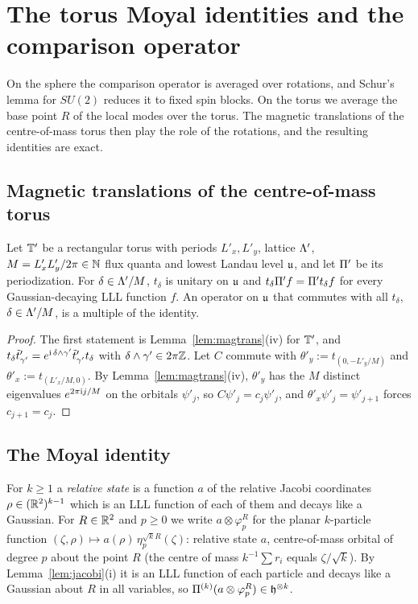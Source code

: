\section{The torus Moyal identities and the comparison operator}\label{sec:moyal}

On the sphere the comparison operator is averaged over rotations, and Schur's lemma for $SU(2)$ reduces it to fixed
spin blocks. On the torus we average the base point $R$ of the local modes over the torus. The magnetic translations
of the centre-of-mass torus then play the role of the rotations, and the resulting identities are exact.

\subsection{Magnetic translations of the centre-of-mass torus}

\begin{lemma}\label{lem:irred}
Let $\mathbb{T}'$ be a rectangular torus with periods $L'_x,L'_y$, lattice $\Lambda'$, $M=L'_xL'_y/2\pi\in\mathbb{N}$ flux quanta and lowest
Landau level $\mathfrak{u}$, and let $\Pi'$ be its periodization. For $\delta\in\Lambda'/M$, $t_\delta$ is unitary on $\mathfrak{u}$ and
$t_\delta\Pi'f=\Pi't_\delta f$ for every Gaussian-decaying LLL function $f$. An operator on $\mathfrak{u}$ that commutes with all $t_\delta$,
$\delta\in\Lambda'/M$, is a multiple of the identity.
\end{lemma}

\begin{proof}
The first statement is Lemma~\ref{lem:magtrans}(iv) for $\mathbb{T}'$, and $t_\delta\tilde t'_{\gamma'}=e^{\mathrm{i}\,\delta\wedge\gamma'}\tilde t'_{\gamma'}t_\delta$
with $\delta\wedge\gamma'\in2\pi\mathbb{Z}$. Let $C$ commute with $\theta'_y:=t_{(0,-L'_y/M)}$ and $\theta'_x:=t_{(L'_x/M,0)}$. By
Lemma~\ref{lem:magtrans}(iv), $\theta'_y$ has the $M$ distinct eigenvalues $e^{2\pi\mathrm{i} j/M}$ on the orbitals $\psi'_j$, so
$C\psi'_j=c_j\psi'_j$, and $\theta'_x\psi'_j=\psi'_{j+1}$ forces $c_{j+1}=c_j$.
\end{proof}

\subsection{The Moyal identity}

For $k\ge1$ a \emph{relative state} is a function $a$ of the relative Jacobi coordinates $\rho\in(\mathbb{R}^2)^{k-1}$ which is an LLL
function of each of them and decays like a Gaussian. For $R\in\mathbb{R}^2$ and $p\ge0$ we write $a\otimes\varphi_p^R$ for the planar
$k$-particle function $(\zeta,\rho)\mapsto a(\rho)\,\eta_p^{\sqrt kR}(\zeta)$: relative state $a$, centre-of-mass orbital of
degree $p$ about the point $R$ (the centre of mass $k^{-1}\sum r_i$ equals $\zeta/\sqrt k$). By Lemma~\ref{lem:jacobi}(i) it is an
LLL function of each particle and decays like a Gaussian about $R$ in all variables, so $\Pi^{(k)}(a\otimes\varphi_p^R)\in\mathfrak{h}^{\otimes k}$.

